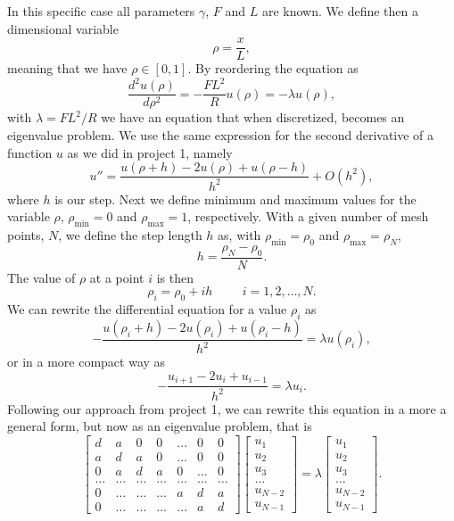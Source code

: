 \documentclass[%
oneside,                 %
final,                   %
10pt]{article}
\begin{document}
In this specific case all parameters $\gamma$, $F$ and $L$ are known. We define then a dimensional variable
\[
 \rho = \frac{x}{L}, 
\]
meaning that we have $\rho \in [0,1]$.    By reordering the equation as 
\[
 \frac{d^2 u(\rho)}{d\rho^2} = -\frac{FL^2}{R} u(\rho)=-\lambda u(\rho),
\]
with $\lambda= FL^2/R$ we have an equation that when discretized, becomes an eigenvalue problem.
We use the same 
expression for the second derivative of a function $u$ as we did in project 1, namely
\begin{equation}
    u''=\frac{u(\rho+h) -2u(\rho) +u(\rho-h)}{h^2} +O(h^2),
    \label{eq:diffoperation}
\end{equation}
where $h$ is our step.
Next we define minimum and maximum values for the variable $\rho$,
$\rho_{\mathrm{min}}=0$  and $\rho_{\mathrm{max}}=1$, respectively.
With a given number of mesh points, $N$, we 
define the step length $h$ as, with $\rho_{\mathrm{min}}=\rho_0$  and $\rho_{\mathrm{max}}=\rho_N$,
\begin{equation*}
  h=\frac{\rho_N-\rho_0 }{N}.
\end{equation*}
The value of $\rho$ at a point $i$ is then 
\[
    \rho_i= \rho_0 + ih \hspace{1cm} i=1,2,\dots , N.
\]
We can rewrite the differential equation for a value $\rho_i$ as
\[
-\frac{u(\rho_i+h) -2u(\rho_i) +u(\rho_i-h)}{h^2}  = \lambda u(\rho_i),
\]
or in  a more compact way as
\[
-\frac{u_{i+1} -2u_i +u_{i-1} }{h^2}  = \lambda u_i.
\]
Following our approach from project 1, we can rewrite this equation in a more a general form, but now 
as an eigenvalue problem, that is
\begin{equation}
    \begin{bmatrix} d& a & 0   & 0    & \dots  &0     & 0 \\
                                a & d & a & 0    & \dots  &0     &0 \\
                                0   & a & d & a  &0       &\dots & 0\\
                                \dots  & \dots & \dots & \dots  &\dots      &\dots & \dots\\
                                0   & \dots & \dots & \dots  &a  &d & a\\
                                0   & \dots & \dots & \dots  &\dots       &a & d\end{bmatrix} 
                                 \begin{bmatrix} u_1 \\ u_2 \\ u_3 \\ \dots \\ u_{N-2} \\ u_{N-1}\end{bmatrix} = \lambda \begin{bmatrix} u_1 \\ u_2 \\ u_3 \\ \dots \\ u_{N-2} \\ u_{N-1}\end{bmatrix} . 
\label{eq:matrixse} 
\end{equation}
\end{document}
